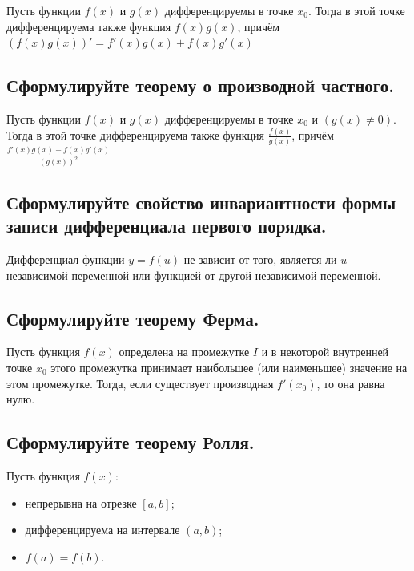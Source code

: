 Пусть функции $f(x)$ и $g(x)$ дифференцируемы в точке $x_0$. Тогда в этой точке дифференцируема также функция $f(x)g(x)$, причём $(f(x)g(x))' = f'(x)g(x)+f(x)g'(x)$


\subsection{Сформулируйте теорему о производной частного.}

Пусть функции $f(x)$ и $g(x)$ дифференцируемы в точке $x_0$ и $(g(x) \ne 0)$. Тогда в этой точке дифференцируема также функция $\frac{f(x)}{g(x)}$, причём $\frac{f'(x)g(x)-f(x)g'(x)}{(g(x))^2}$


\subsection{Сформулируйте свойство инвариантности формы записи дифференциала первого порядка.}

Дифференциал функции $y = f(u)$ не зависит от того, является ли $u$ независимой переменной или функцией от другой независимой переменной.


\subsection{Сформулируйте теорему Ферма.}

Пусть функция $f(x)$ определена на промежутке $I$ и в некоторой внутренней точке $x_0$ этого промежутка принимает наибольшее (или наименьшее) значение на этом промежутке. Тогда, если существует производная $f'(x_0)$, то она равна нулю.


\subsection{Сформулируйте теорему Ролля.}

Пусть функция $f(x)$:
\begin{itemize}
    \item непрерывна на отрезке $[a,b]$;
    \item дифференцируема на интервале $(a,b)$;
    \item $f(a) = f(b)$. 
\end{itemize}

